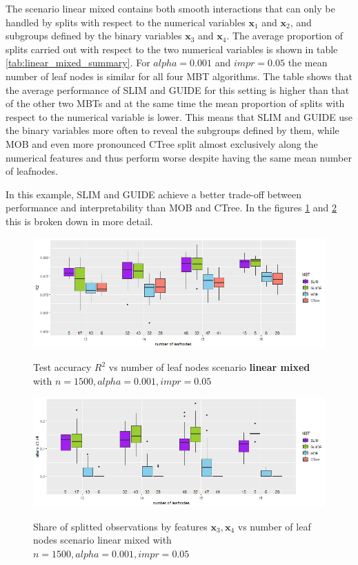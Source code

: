 The scenario linear mixed contains both smooth interactions that can only be handled by splits with respect to the numerical variables $\textbf{x}_1$ and $\textbf{x}_2$, and subgroups defined by the binary variables $\textbf{x}_3$ and $\textbf{x}_4$. 
The average proportion of splits carried out with respect to the two numerical variables is shown in table \ref{tab:linear_mixed_summary}.
For $alpha = 0.001$ and $impr = 0.05$ the mean number of leaf nodes is similar for all four MBT algorithms. The table shows that the average performance of SLIM and GUIDE for this setting is higher than that of the other two MBTs and at the same time the mean proportion of splits with respect to the numerical variable is lower.  This means that SLIM and GUIDE use the binary variables more often to reveal the subgroups defined by them, while MOB and even more pronounced CTree split almost exclusively along the numerical features and thus perform worse despite having the same mean number of leafnodes. 

In this example, SLIM and GUIDE achieve a better trade-off between performance and interpretability than MOB and CTree.
In the figures \ref{fig:lm_1000_standalone_r2_test}  and \ref{fig:lm_1000_standalone_share_x3x4} this is broken down in more detail.


\begin{figure}[!htb]
\caption{Test accuracy $R^2$ vs number of leaf nodes scenario \textbf{linear mixed} with $n=1500, alpha = 0.001, impr = 0.05$}
    \includegraphics[width=16cm]{Figures/simulations/batchtools/basic_scenarios/linear_mixed/lm_1000_standalone_r2_test.png}
    \label{fig:lm_1000_standalone_r2_test}
\end{figure} 


\begin{figure}[!htb]
\caption{Share of splitted observations by features $\textbf{x}_3, \textbf{x}_4$ vs number of leaf nodes scenario linear mixed with $n=1500, alpha = 0.001, impr = 0.05$}
    \includegraphics[width=16cm]{Figures/simulations/batchtools/basic_scenarios/linear_mixed/lm_1000_standalone_share_x3x4.png}
    \label{fig:lm_1000_standalone_share_x3x4}
\end{figure} 




